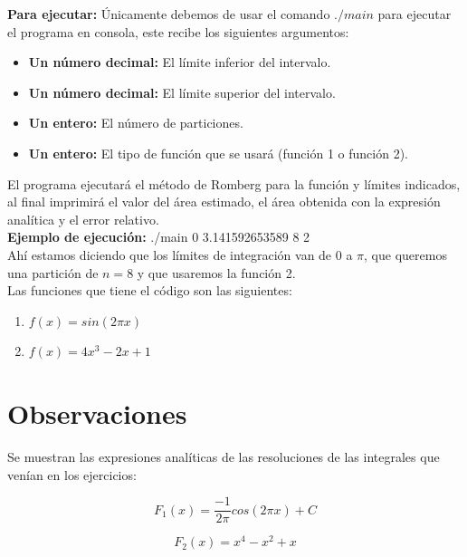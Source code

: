 \documentclass[12pt]{article}
\begin{document}
\textbf{Para ejecutar:} Únicamente debemos de usar el comando $./main$ para ejecutar el programa en consola, este recibe los siguientes argumentos:
\begin{itemize}
	\item \textbf{Un número decimal:} El límite inferior del intervalo.
	\item \textbf{Un número decimal:} El límite superior del intervalo.
	\item \textbf{Un entero:} El número de particiones.
	\item \textbf{Un entero:} El tipo de función que se usará (función 1 o función 2). 
\end{itemize}

El programa ejecutará el método de Romberg para la función y límites indicados, al final imprimirá el valor del área estimado, el área obtenida con la expresión analítica y el error relativo.\\

\textbf{Ejemplo de ejecución:} ./main 0 3.141592653589 8 2\\

Ahí estamos diciendo que los límites de integración van de 0 a $\pi$, que queremos una partición de $n = 8$ y que usaremos la función 2.\\
Las funciones que tiene el código son las siguientes:
\begin{enumerate}
	\item $f(x) = sin(2 \pi x)$
	\item $f(x) = 4x^3 - 2x + 1$
\end{enumerate}

\section{Observaciones}
Se muestran las expresiones analíticas de las resoluciones de las integrales que venían en los ejercicios:

$$F_1(x) = \frac{-1}{2 \pi} cos(2 \pi x) + C$$

$$F_2(x) = x^4 - x^2 + x$$
\end{document}
